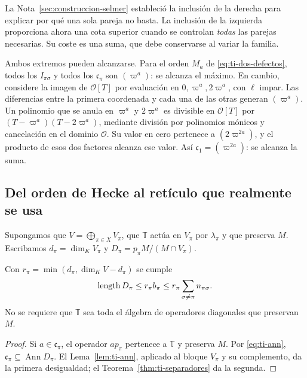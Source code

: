 La Nota~\ref{sec:construccion-selmer} estableció la inclusión
de la derecha para explicar por qué una sola pareja no basta.
La inclusión de la izquierda proporciona ahora una cota superior
cuando se controlan \emph{todas} las parejas necesarias.
Su coste es una suma, que debe conservarse al variar la familia.

Ambos extremos pueden alcanzarse. Para el orden $M_a$ de
\eqref{eq:ti-dos-defectos}, todos los $I_{\pi\sigma}$ y todos
los $\mathfrak c_\pi$ son $(\varpi^a)$: se alcanza el máximo.
En cambio, considere la imagen de $\mathcal O[T]$ por evaluación
en $0,\varpi^a,2\varpi^a$, con $\ell$ impar.
Las diferencias entre la primera coordenada y cada una de las
otras generan $(\varpi^a)$. Un polinomio que se anula en
$\varpi^a$ y $2\varpi^a$ es divisible en $\mathcal O[T]$
por $(T-\varpi^a)(T-2\varpi^a)$, mediante división por
polinomios mónicos y cancelación en el dominio $\mathcal O$.
Su valor en cero pertenece a $(2\varpi^{2a})$, y el producto
de esos dos factores alcanza ese valor. Así
$\mathfrak c_1=(\varpi^{2a})$: se alcanza la suma.

\subsection{Del orden de Hecke al retículo que realmente se usa}

Supongamos que $V=\bigoplus_{\pi\in X}V_\pi$, que $\mathbb T$
actúa en $V_\pi$ por $\lambda_\pi$ y que preserva $M$.
Escribamos $d_\pi=\dim_KV_\pi$ y
$D_\pi=p_\pi M/(M\cap V_\pi)$.

\begin{proposicion}
\label{prop:ti-defecto-parejas}
Con $r_\pi=\min(d_\pi,\dim_KV-d_\pi)$ se cumple
\begin{equation}
 \operatorname{length} D_\pi\le r_\pi b_\pi
 \le r_\pi\sum_{\sigma\ne\pi}n_{\pi\sigma}.
 \label{eq:ti-defecto-parejas}
\end{equation}
No se requiere que $\mathbb T$ sea toda el álgebra de operadores
diagonales que preservan $M$.
\end{proposicion}
\begin{proof}
Si $a\in\mathfrak c_\pi$, el operador $a p_\pi$ pertenece
a $\mathbb T$ y preserva $M$. Por \eqref{eq:ti-ann},
$\mathfrak c_\pi\subseteq\operatorname{Ann}D_\pi$.
El Lema~\ref{lem:ti-ann}, aplicado al bloque $V_\pi$ y su
complemento, da la primera desigualdad; el
Teorema~\ref{thm:ti-separadores} da la segunda.
\end{proof}

